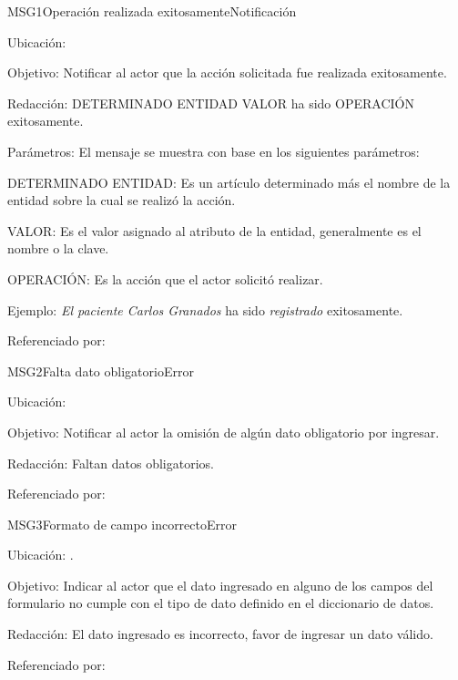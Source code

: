 \begin{mensaje}{MSG1}{Operación realizada exitosamente}{Notificación}
    \item[Ubicación:] \msjSuperior
    \item[Objetivo:] Notificar al actor que la acción solicitada fue realizada exitosamente.
    \item[Redacción:] DETERMINADO ENTIDAD VALOR ha sido OPERACIÓN exitosamente.
    \item[Parámetros:] El mensaje se muestra con base en los siguientes parámetros:
    \begin{Citemize}
	\item DETERMINADO ENTIDAD: Es un artículo determinado más el nombre de la entidad sobre la cual se realizó la acción.
	\item VALOR: Es el valor asignado al atributo de la entidad, generalmente es el nombre o la clave.
	\item OPERACIÓN: Es la acción que el actor solicitó realizar.
    \end{Citemize}
    \item[Ejemplo:] {\em El paciente Carlos Granados} ha sido {\em registrado} exitosamente.
    \item[Referenciado por:] 
\end{mensaje}

\begin{mensaje}{MSG2}{Falta dato obligatorio}{Error}
	\item[Ubicación:] \msjCampo
	\item[Objetivo:] Notificar al actor la omisión de algún dato obligatorio por ingresar.
	\item[Redacción:] Faltan datos obligatorios.
	\item[Referenciado por:] 
\end{mensaje}

\begin{mensaje}{MSG3}{Formato de campo incorrecto}{Error}
	\item[Ubicación:] \msjCampo.
	\item[Objetivo:] Indicar al actor que el dato ingresado en alguno de los campos del formulario no cumple con el tipo de dato definido en el diccionario de datos.
	\item[Redacción:] El dato ingresado es incorrecto, favor de ingresar un dato válido.
	\item[Referenciado por:] 
\end{mensaje}

